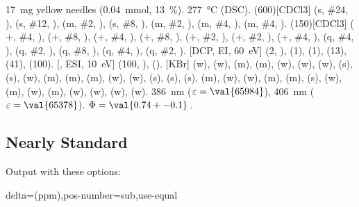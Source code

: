 \documentclass{chemmacros-manual}
\begin{document}
\begin{sourcecode}
  \begin{experimental}[<optionen>]
     \qty{17}{\milli\gram} yellow needles (\qty{0.04}{\milli\mole},
      \qty{13}{\percent}).
     \qty{277}{\celsius} (DSC).
    \NMR(600)[CDCl3]  (s, \#{24}, ),  (s, \#{12},
    ),  (m, \#{2}, ),  (s, \#{8},
    ),  (m, \#{2}, ),  (m, \#{4},
    ),  (m, \#{4}, ).
    (150)[CDCl3]  ($+$, \#{4}, ),  ($+$,
    \#{8}, ),  ($+$, \#{4}, ),  ($+$, \#{8},
    ),  ($+$, \#{2}, ),  ($+$, \#{2},
    ),  ($+$, \#{4}, ),  (q, \#{4},
    ),  (q, \#{2}, ),  (q, \#{8}, ),
     (q, \#{4}, ),  (q, \#{2}, ).
    [DCP, EI, \qty{60}{\electronvolt}]  (2, ), 
    (1),  (1),  (13),  (41),  (100).
    [, ESI, \qty{10}{\electronvolt}]  (100,
    ),  ().
    [KBr]  (w),  (w),  (m), 
    (m),  (w),  (w),  (w),  (s),
     (s),  (w),  (m),  (m), 
    (m),  (w),  (w),  (s),  (s),
     (s),  (m),  (w),  (w), 
    (m),  (m),  (s),  (w),  (m), 
    (w),  (m),  (w),  (w),  (w), 
    (w).
     \qty{386}{\nano\metre} ($\varepsilon = \val{65984}$),
    \qty{406}{\nano\metre} ($\varepsilon = \val{65378}$).
     $\Phi = \val{0.74+-0.1}$\,.
  \end{experimental}
\end{sourcecode}

\subsection{Nearly Standard}
Output with these options:

\begin{sourcecode}
  delta=(ppm),pos-number=sub,use-equal
\end{sourcecode}
\end{document}

